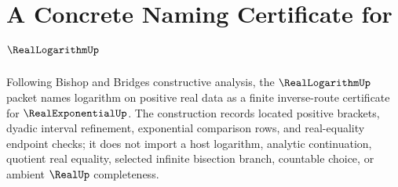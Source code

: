 \chapter{A Concrete Naming Certificate for $\RealLogarithmUp$}
\label{ch:concrete-instances-real-logarithm-namecert}

Following Bishop and Bridges constructive analysis, the $\RealLogarithmUp$ packet names logarithm on positive real data as a finite inverse-route certificate for $\RealExponentialUp$. The construction records located positive brackets, dyadic interval refinement, exponential comparison rows, and real-equality endpoint checks; it does not import a host logarithm, analytic continuation, quotient real equality, selected infinite bisection branch, countable choice, or ambient $\RealUp$ completeness.

